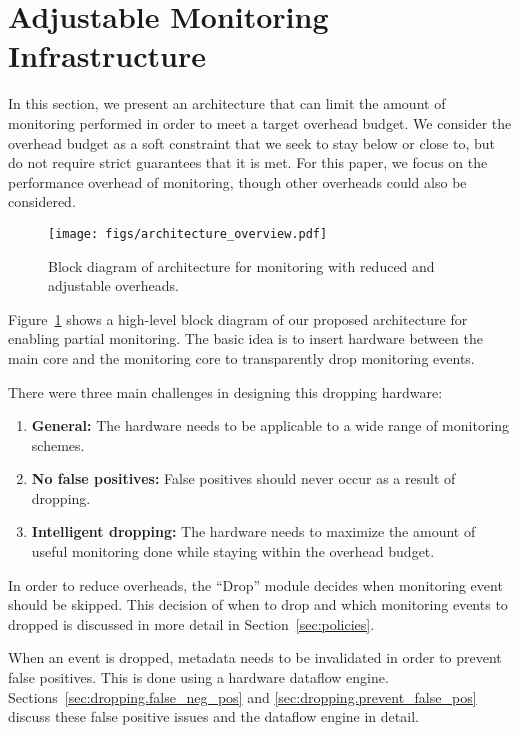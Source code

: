 \section{Adjustable Monitoring Infrastructure}
\label{sec:dropping}

In this section, we present an architecture that can limit the amount of
monitoring performed in order to meet a target overhead budget. We consider the
overhead budget as a soft constraint that we seek to stay below or close to,
but do not require strict guarantees that it is met. For this paper, we focus on
the performance overhead of monitoring, though other overheads could also be
considered. 

\begin{figure}
  \begin{center}
    \texttt{[image: figs/architecture\_overview.pdf]}
    \vspace{-0.2in}
    \caption{Block diagram of architecture for monitoring with reduced and adjustable overheads.}
    \label{fig:dropping.overview}
    \vspace{-0.1in}
  \end{center}
\end{figure}

Figure~\ref{fig:dropping.overview} shows a high-level block diagram of our
proposed architecture for enabling partial monitoring. The basic idea is to
insert hardware between the main core and the monitoring core to transparently
drop monitoring events. 

There were three main challenges in designing this dropping hardware:
\begin{enumerate}
  \item \textbf{General:} The hardware needs to be applicable to a wide range of monitoring schemes.
  \item \textbf{No false positives:} False positives should never occur as a result of dropping.
  \item \textbf{Intelligent dropping:} The hardware needs to maximize the amount of useful monitoring done while staying within the overhead budget.
\end{enumerate}

In order to reduce overheads, the ``Drop'' module decides when monitoring event
should be skipped.  This decision of when to drop and which monitoring events
to dropped is discussed in more detail in Section~\ref{sec:policies}.

When an event is dropped, metadata needs to be invalidated in order to prevent
false positives. This is done using a hardware dataflow engine.
Sections~\ref{sec:dropping.false_neg_pos} and
\ref{sec:dropping.prevent_false_pos} discuss these false positive issues and
the dataflow engine in detail. 

